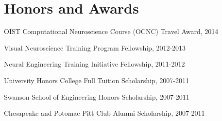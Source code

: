 \documentclass[10pt,letterpaper]{article}
\renewenvironment{itemize}{
  \begin{list}{}{
    \setlength{\leftmargin}{1.5em}
    \setlength{\itemsep}{0.25em}
    \setlength{\parskip}{0pt}
    \setlength{\parsep}{0.25em}
  }
}{
  \end{list}
}
\begin{document}
\vspace{-0.25in}

\section*{Honors and Awards}
\vspace{-0.05in}
\begin{itemize}
  \setlength\itemsep{1pt}
  \item OIST Computational Neuroscience Course (OCNC) Travel Award, 2014
  \item Visual Neuroscience Training Program Fellowship, 2012-2013
\item Neural Engineering Training Initiative Fellowship, 2011-2012
\item University Honors College Full Tuition Scholarship, 2007-2011
\item Swanson School of Engineering Honors Scholarship, 2007-2011
\item Chesapeake and Potomac Pitt Club Alumni Scholarship, 2007-2011
\end{itemize}

\vspace{-0.25in}
\end{document}
